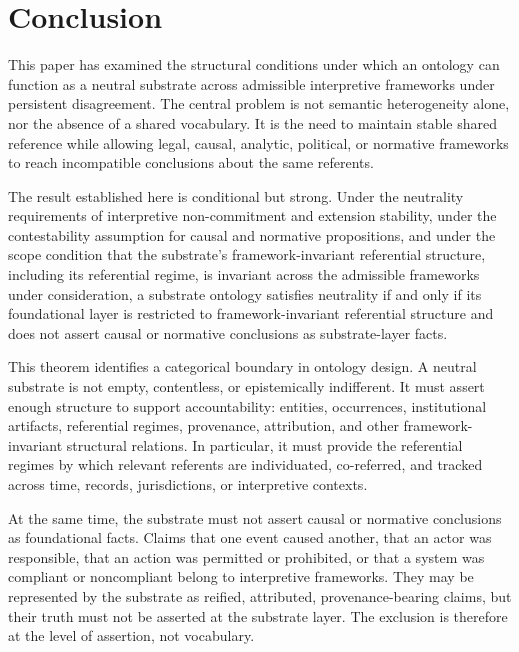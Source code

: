 \section{Conclusion}
\label{sec:conclusion}

This paper has examined the structural conditions under which
an ontology can function as a neutral substrate
across admissible interpretive frameworks under persistent disagreement.
The central problem is not semantic heterogeneity alone,
nor the absence of a shared vocabulary.
It is the need to maintain stable shared reference
while allowing legal, causal, analytic, political,
or normative frameworks to reach incompatible conclusions
about the same referents.

The result established here is conditional but strong.
Under the neutrality requirements of interpretive non-commitment
and extension stability,
under the contestability assumption for causal and normative propositions,
and under the scope condition
that the substrate's
framework-invariant referential structure, including its
referential regime,
is invariant
across the admissible frameworks under consideration,
a substrate ontology satisfies neutrality if and only if
its foundational layer is restricted to framework-invariant
referential structure and
does not assert
causal or normative conclusions as substrate-layer facts.

This theorem identifies a categorical boundary
in ontology design.
A neutral substrate is not empty,
contentless, or epistemically indifferent.
It must assert enough structure to support accountability:
entities, occurrences, institutional artifacts,
referential regimes, provenance, attribution,
and other framework-invariant structural relations.
In particular, it must provide the referential regimes
by which relevant referents are individuated,
co-referred, and tracked across time, records,
jurisdictions, or interpretive contexts.

At the same time,
the substrate must not assert causal or normative conclusions
as foundational facts.
Claims that one event caused another,
that an actor was responsible,
that an action was permitted or prohibited,
or that a system was compliant or noncompliant
belong to interpretive frameworks.
They may be represented by the substrate as reified,
attributed, provenance-bearing claims,
but their truth must not be asserted at the substrate layer.
The exclusion is therefore at the level of assertion,
not vocabulary.

